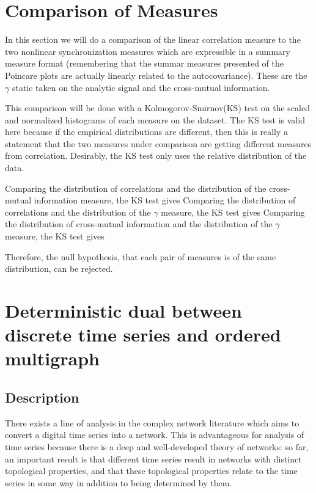 \documentclass[12pt]{article}
\begin{document}
\section{Comparison of Measures}

In this section we will do a comparison of the linear correlation measure to the two nonlinear synchronization measures which are expressible in a summary measure format (remembering that the summar measures presented of the Poincare plots are actually linearly related to the autocovariance)\cite{kamen}. These are the $\gamma$ static taken on the analytic signal and the cross-mutual information.

This comparison will be done with a Kolmogorov-Smirnov(KS) test on the scaled and normalized histograms of each measure on the dataset. The KS test is valid here because if the empirical distributions are different, then this is really a statement that the two measures under comparison are getting different measures from correlation. Desirably, the KS test only uses the relative distribution of the data. 

Comparing the distribution of correlations and the distribution of the cross-mutual information measure, the KS test gives %
Comparing the distribution of correlations and the distribution of the $\gamma$ measure, the KS test gives %
Comparing the distribution of cross-mutual information and the distribution of the $\gamma$ measure, the KS test gives %

Therefore, the null hypothesis, that each pair of measures is of the same distribution, can be rejected.

\section{Deterministic dual between discrete time series and ordered multigraph}

\subsection{Description}

There exists a line of analysis in the complex network literature which aims to convert a digital time series into a network. This is advantageous for analysis of time series because there is a deep and well-developed theory of networks: so far, an important result is that different time series result in networks with distinct topological properties, and that these topological properties relate to the time series in some way in addition to being determined by them\cite{campanharo}.
\end{document}
